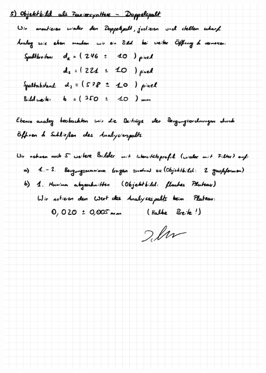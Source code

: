 \documentclass{article}
\begin{document}
\includegraphics[width=\textwidth]{graphics/messprotokoll/233 - Fourieroptik-11.jpg}
\newpage

\addtocounter{table}{5}

\clearpage
\newpage
\end{document}
